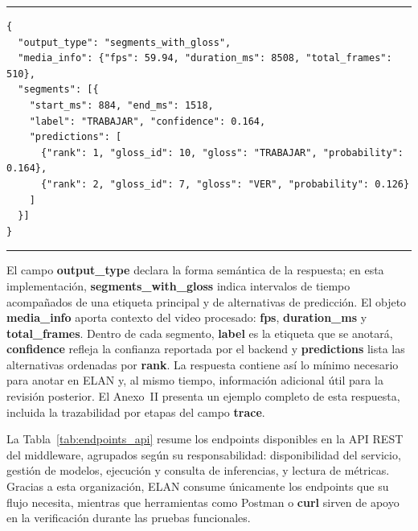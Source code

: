\documentclass[11pt,a4paper]{article}
\begin{document}
\begin{center}
\begin{minipage}{0.92\textwidth}
\hrule
\vspace{0.12cm}
\footnotesize
\begin{Verbatim}[baselinestretch=0.76]
{
  "output_type": "segments_with_gloss",
  "media_info": {"fps": 59.94, "duration_ms": 8508, "total_frames": 510},
  "segments": [{
    "start_ms": 884, "end_ms": 1518,
    "label": "TRABAJAR", "confidence": 0.164,
    "predictions": [
      {"rank": 1, "gloss_id": 10, "gloss": "TRABAJAR", "probability": 0.164},
      {"rank": 2, "gloss_id": 7, "gloss": "VER", "probability": 0.126}
    ]
  }]
}
\end{Verbatim}
\vspace{0.05cm}
\hrule

\label{lst:respuesta_backend_middleware}
\end{minipage}
\end{center}

El campo \textbf{output\_type} declara la forma semántica de la respuesta; en esta implementación, \textbf{segments\_with\_gloss} indica intervalos de tiempo acompañados de una etiqueta principal y de alternativas de predicción. El objeto \textbf{media\_info} aporta contexto del video procesado: \textbf{fps}, \textbf{duration\_ms} y \textbf{total\_frames}. Dentro de cada segmento, \textbf{label} es la etiqueta que se anotará, \textbf{confidence} refleja la confianza reportada por el backend y \textbf{predictions} lista las alternativas ordenadas por \textbf{rank}. La respuesta contiene así lo mínimo necesario para anotar en ELAN y, al mismo tiempo, información adicional útil para la revisión posterior. El Anexo~II presenta un ejemplo completo de esta respuesta, incluida la trazabilidad por etapas del campo \textbf{trace}.

La Tabla~\ref{tab:endpoints_api} resume los endpoints disponibles en la API REST del middleware, agrupados según su responsabilidad: disponibilidad del servicio, gestión de modelos, ejecución y consulta de inferencias, y lectura de métricas. Gracias a esta organización, ELAN consume únicamente los endpoints que su flujo necesita, mientras que herramientas como Postman o \textbf{curl} sirven de apoyo en la verificación durante las pruebas funcionales.
\end{document}
